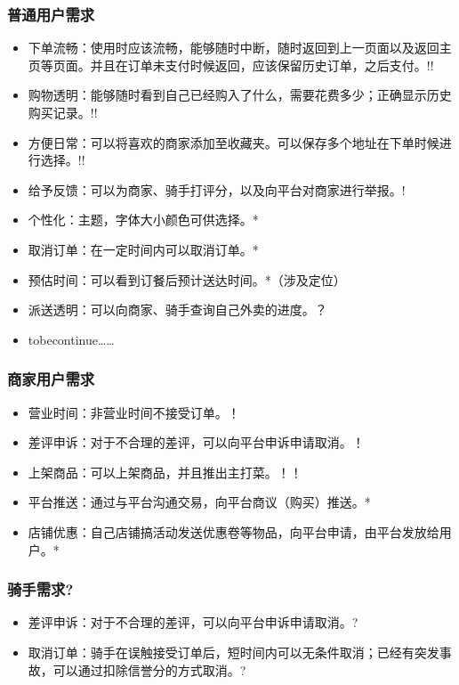 \subsubsection{普通用户需求}
\begin{itemize}
    \item{下单流畅}：使用时应该流畅，能够随时中断，随时返回到上一页面以及返回主页等页面。并且在订单未支付时候返回，应该保留历史订单，之后支付。!!
    \item{购物透明}：能够随时看到自己已经购入了什么，需要花费多少；正确显示历史购买记录。!!
    \item{方便日常}：可以将喜欢的商家添加至收藏夹。可以保存多个地址在下单时候进行选择。!!
    \item{给予反馈}：可以为商家、骑手打评分，以及向平台对商家进行举报。!
    
    \item {个性化}：主题，字体大小颜色可供选择。*
    \item {取消订单}：在一定时间内可以取消订单。*
    \item{预估时间}：可以看到订餐后预计送达时间。*（涉及定位）
    
    \item {派送透明}：可以向商家、骑手查询自己外卖的进度。？
    \item{tobecontinue}……
\end{itemize}

\subsubsection{商家用户需求}
\begin{itemize}
    \item {营业时间}：非营业时间不接受订单。！
    \item {差评申诉}：对于不合理的差评，可以向平台申诉申请取消。！
    \item {上架商品}：可以上架商品，并且推出主打菜。！！
    
    \item{平台推送}：通过与平台沟通交易，向平台商议（购买）推送。*
    \item {店铺优惠}：自己店铺搞活动发送优惠卷等物品，向平台申请，由平台发放给用户。*
\end{itemize}

\subsubsection{骑手需求?}
\begin{itemize}
    \item {差评申诉}：对于不合理的差评，可以向平台申诉申请取消。?
    \item {取消订单}：骑手在误触接受订单后，短时间内可以无条件取消；已经有突发事故，可以通过扣除信誉分的方式取消。?
\end{itemize}


